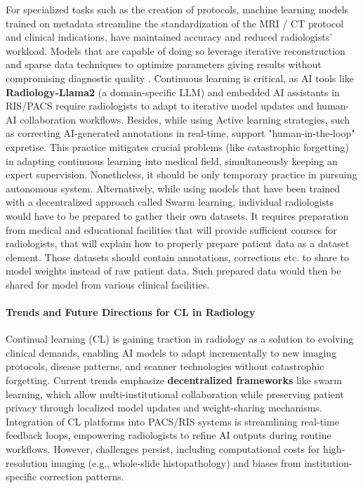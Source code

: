 \documentclass{IEEEcsmag}
\begin{document}
    For specialized tasks such as the creation of protocols, machine learning models trained on metadata streamline the standardization of the MRI / CT protocol and clinical indications, have maintained accuracy and reduced radiologists' workload\cite{cite-16}.
    Models that are capable of doing so leverage iterative reconstruction and sparse data techniques to optimize parameters giving results without compromising diagnostic quality \cite{cite-16}.
    Continuous learning is critical, as AI tools like \textbf{Radiology-Llama2} (a domain-specific LLM) and embedded AI assistants in RIS/PACS require radiologists to adapt to iterative model updates and human-AI collaboration workflows\cite{cite-3}\cite{cite-6}.
    Besides, while using Active learning strategies, such as correcting AI-generated annotations in real-time, support "human-in-the-loop" expretise.
    This practice mitigates crucial problems (like catastrophic forgetting) in adapting continuous learning into medical field, simultaneously keeping an expert supervision\cite{cite-6}.
    Nonetheless, it should be only temporary practice in pursuing autonomous system.
    Alternatively, while using models that have been trained with a decentralized approach called Swarm learning, individual radiologists would have to be prepared to gather their own datasets.
    It requires preparation from medical and educational facilities that will provide sufficient courses for radiologists, that will explain how to properly prepare patient data as a dataset element.
    Those datasets should contain annotations, corrections etc. to share to model weights instead of raw patient data\cite{cite-6}\cite{cite-8}.
    Such prepared data would then be shared for model from various clinical facilities.

    \paragraph{Trends and Future Directions for CL in Radiology}
    Continual learning (CL) is gaining traction in radiology as a solution to evolving clinical demands, enabling AI models to adapt incrementally to new imaging protocols, disease patterns, and scanner technologies without catastrophic forgetting.
    Current trends emphasize \textbf{decentralized frameworks} like swarm learning, which allow multi-institutional collaboration while preserving patient privacy through localized model updates and weight-sharing mechanisms\cite{cite-27}.
    Integration of CL platforms into PACS/RIS systems is streamlining real-time feedback loops, empowering radiologists to refine AI outputs during routine workflows\cite{cite-27}.
    However, challenges persist, including computational costs for high-resolution imaging (e.g., whole-slide histopathology) and biases from institution-specific correction patterns\cite{cite-27}.
\end{document}
